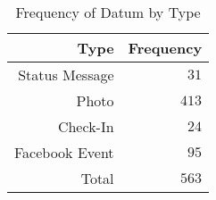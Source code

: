 \begin{table}[htp]
	\begin{center}
	\caption{Frequency of Datum by Type}
	\label{tab:table_datums_by_type}
		\begin{tabular}{r r}
		\toprule
			{Type} & {Frequency}\\
			\midrule
			Status Message & $31$\\
			Photo & $413$\\
			Check-In & $24$\\
			Facebook Event & $95$\\
			\midrule Total & $563$\\
		\bottomrule
		\end{tabular}
	\end{center}
\end{table}